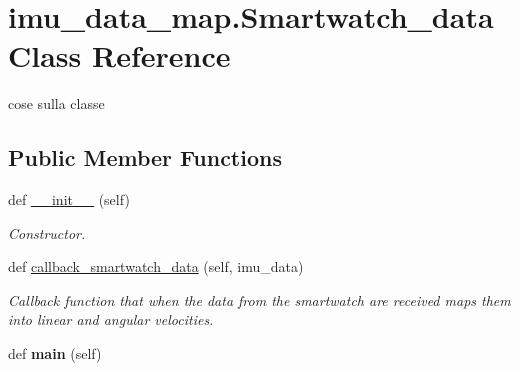 \hypertarget{classimu__data__map_1_1Smartwatch__data}{}\section{imu\+\_\+data\+\_\+map.\+Smartwatch\+\_\+data Class Reference}
\label{classimu__data__map_1_1Smartwatch__data}


cose sulla classe  


\subsection*{Public Member Functions}
\begin{DoxyCompactItemize}
\item 
\mbox{\label{classimu__data__map_1_1Smartwatch__data_a6d7e817bc4eaea9d4362ee8535aa3441}} 
def \mbox{\hyperlink{classimu__data__map_1_1Smartwatch__data_a6d7e817bc4eaea9d4362ee8535aa3441}{\+\_\+\+\_\+init\+\_\+\+\_\+}} (self)
\begin{DoxyCompactList}\small\item\em Constructor. \end{DoxyCompactList}\item 
def \mbox{\hyperlink{classimu__data__map_1_1Smartwatch__data_ae90cc1ac064c75ea42f00bc34b168708}{callback\+\_\+smartwatch\+\_\+data}} (self, imu\+\_\+data)
\begin{DoxyCompactList}\small\item\em Callback function that when the data from the smartwatch are received maps them into linear and angular velocities. \end{DoxyCompactList}\item 
\mbox{\label{classimu__data__map_1_1Smartwatch__data_ab56e26ff9e095e112e4dd199a16b4478}} 
def {\bfseries main} (self)
\end{DoxyCompactItemize}
